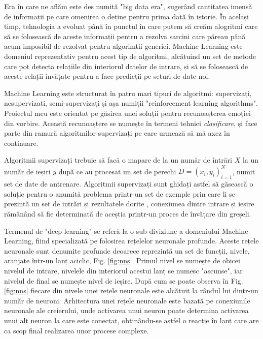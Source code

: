 \documentclass[a4paper,12pt]{book}
\begin{document}
			Era în care ne aflăm este des numită "big data era", sugerând cantitatea imensă de informații pe care omenirea o deține pentru prima dată în istorie. În același timp, tehnologia a evoluat până în punctul în care putem să creăm alogritmi care să se folosească de aceste informații pentru a rezolva sarcini care păreau până acum imposibil de rezolvat pentru algorimtii generici. Machine Learning este domeniul reprezentativ pentru acest tip de algoritmi, alcătuind un set de metode care pot detecta relațiile din interiorul datelor de intrare, și să se folosească de aceste relații învățate pentru a face predicții pe seturi de date noi. \par
			
			Machine Learning este structurat în patru mari tipuri de algoritmi: supervizați, nesupervizati, semi-supervizați și așa numiții "reinforcement learning algorithms". Proiectul meu este orientat pe găsirea unei soluții pentru recunoașterea emoției din vorbire. Această recunoaștere se numește în termeni tehnici \textit{clasificare}, și face parte din ramură algoritmilor supervizați pe care urmează să mă axez în continuare. \par 
			Algoritmii supervizați trebuie să facă o mapare de la un număr de întrări $X$ la un număr de ieșiri $y$ după ce au procesat un set de perechi $D={(x_i,y_i)}^N_{i=1}$, numit set de date de antrenare. Algoritmii supervizați sunt ghidați astfel să găsească o soluție pentru o anumită problema printr-un set de exemple prin care li se prezintă un set de intrări și rezultatele dorite , conexiunea dintre intrare și ieșire rămânând să fie determinată de aceștia printr-un proces de învățare din greșeli. \par
			
			Termenul de "deep learning" se referă la o sub-diviziune a domeniului Machine Learning, fiind specializată pe folosirea rețelelor neuronale profunde. Aceste rețele neuronale sunt denumite profunde deoarece reprezintă un set de funcții, nivele, aranjate într-un lanț aciclic, Fig. \ref{fig:nns}. Primul nivel se numește de obicei nivelul de intrare, nivelele din interiorul acestui lanț se numesc "ascunse", iar nivelul de final se numește nivel de ieșire. După cum se poate observa în Fig. \ref{fig:nns} fiecare din nivele unei rețele neuronale este alcătuit la rândul lui dintr-un număr de neuroni. Arhitectura unei rețele neuronale este bazată pe conexiunile neuronale ale creierului, unde activarea unui neuron poate determina activarea unui alt neuron la care este conectat, obținându-se astfel o reacție în lanț care are ca scop final realizarea unor procese complexe. 
			
\end{document}
